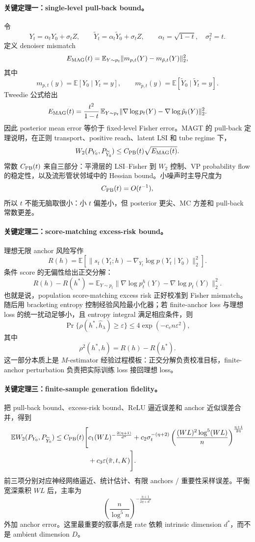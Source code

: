\documentclass[UTF8,11pt]{ctexart}
\newcommand{\E}{\mathbb{E}}
\begin{document}
\paragraph{关键定理一：single-level pull-back bound。}
令
\[
Y_t=\alpha_tY_0+\sigma_tZ,
\qquad
\widetilde Y_t=\alpha_t\widetilde Y_0+\sigma_tZ,
\qquad
\alpha_t=\sqrt{1-t},\quad \sigma_t^2=t.
\]
定义 denoiser mismatch
\[
E_{\rm MAG}(t)
=
\E_{Y\sim p_t}
\|m_{p,t}(Y)-m_{\tilde p,t}(Y)\|_2^2,
\]
其中
\[
m_{p,t}(y)=\E[Y_0\mid Y_t=y],
\qquad
m_{\tilde p,t}(y)=\E[\widetilde Y_0\mid \widetilde Y_t=y].
\]
Tweedie 公式给出
\[
E_{\rm MAG}(t)
=
\frac{t^2}{1-t}\,
\E_{Y\sim p_t}
\|\nabla\log p_t(Y)-\nabla\log\tilde p_t(Y)\|_2^2.
\]
因此 posterior mean error 等价于 fixed-level Fisher error。MAGT 的 pull-back 定理说明，在正则 transport、positive reach、latent LSI 和 tube regime 下，
\[
W_2(P_{Y_0},P_{\widetilde Y_0})
\le
C_{\rm PB}(t)\sqrt{E_{\rm MAG}(t)}.
\]
常数 \(C_{\rm PB}(t)\) 来自三部分：平滑层的 LSI--Fisher 到 \(W_2\) 控制、VP probability flow 的稳定性，以及流形管状邻域中的 Hessian bound。小噪声时主导尺度为
\[
C_{\rm PB}(t)=O(t^{-1}),
\]
所以 \(t\) 不能无脑取很小：小 \(t\) 偏差小，但 posterior 更尖、MC 方差和 pull-back 常数更差。

\paragraph{关键定理二：score-matching excess-risk bound。}
理想无限 anchor 风险写作
\[
R(h)=
\E\left[
\|s_t(Y_t;h)-\nabla_{Y_t}\log p(Y_t\mid Y_0)\|_2^2
\right].
\]
条件 score 的无偏性给出正交分解：
\[
R(h)-R(h^*)
=
\E_{Y\sim p_t}
\|\nabla\log p_t^h(Y)-\nabla\log p_t(Y)\|_2^2.
\]
也就是说，population score-matching excess risk 正好校准到 Fisher mismatch。随后用 bracketing entropy 控制经验风险最小化器；若 finite-anchor loss 与理想 loss 的统一扰动足够小，且 entropy integral 满足相应条件，则
\[
\Pr\{\rho(h^*,\hat h_\lambda)\ge \varepsilon\}
\le
4\exp(-c_en\varepsilon^2),
\]
其中
\[
\rho^2(h^*,h)=R(h)-R(h^*).
\]
这一部分本质上是 \(M\)-estimator 经验过程模板：正交分解负责校准目标，finite-anchor perturbation 负责把实际训练 loss 接回理想 loss。

\paragraph{关键定理三：finite-sample generation fidelity。}
把 pull-back bound、excess-risk bound、ReLU 逼近误差和 anchor 近似误差合并，得到
\[
\begin{aligned}
\E W_2(P_{Y_0},P_{\widetilde Y_0})
\le C_{\rm PB}(t)\Bigg[
&c_1(WL)^{-\frac{2(\eta+1)}{d^*}}
+c_2\sigma_t^{-(\eta+2)}
\left(
\frac{(WL)^2\log^5(WL)}{n}
\right)^{\frac{\eta+1}{2\eta}}\\
&+c_3\varepsilon(\tilde\pi,t,K)
\Bigg].
\end{aligned}
\]
前三项分别对应神经网络逼近、统计估计、有限 anchors / 重要性采样误差。平衡宽深乘积 \(WL\) 后，主率为
\[
\left(\frac{n}{\log^5 n}\right)^{-\frac{\eta+1}{2\eta+d^*}}
\]
外加 anchor error。这里最重要的叙事点是 rate 依赖 intrinsic dimension \(d^*\)，而不是 ambient dimension \(D\)。
\end{document}
